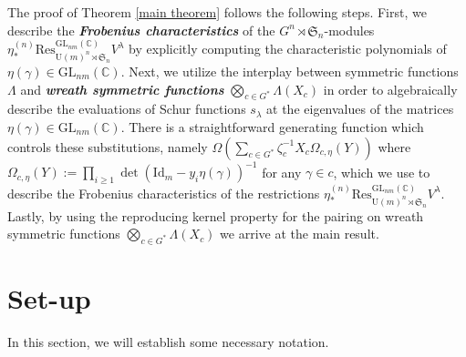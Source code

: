 \documentclass[12pt,reqno]{amsart}
\theoremstyle{definition}
\begin{document}
The proof of Theorem \ref{main theorem} follows the following steps. First, we describe the \textit{\textbf{Frobenius characteristics}} of the $G^{n} \rtimes \mathfrak{S}_n$-modules $\eta^{(n)}_*\mathrm{Res}^{\mathrm{GL}_{nm}(\mathbb{C})}_{\mathrm{U}(m)^{n} \rtimes \mathfrak{S}_n} V^{\lambda}$ by explicitly computing the characteristic polynomials of $\eta(\gamma) \in \mathrm{GL}_{nm}(\mathbb{C}).$ Next, we utilize the interplay between symmetric functions $\Lambda$ and \textit{\textbf{wreath symmetric functions}} $\bigotimes_{c \in G^*} \Lambda(X_{c})$ in order to algebraically describe the evaluations of Schur functions $s_{\lambda}$ at the eigenvalues of the matrices $\eta(\gamma) \in \mathrm{GL}_{nm}(\mathbb{C}).$ There is a straightforward generating function which controls these substitutions, namely $\Omega\left( \sum_{c \in G^*} \zeta_c^{-1} X_{c} \Omega_{c,\eta}(Y) \right)$ where $\Omega_{c,\eta}(Y):= \prod_{i\geq 1} \det( \mathrm{Id}_m - y_i\eta(\gamma))^{-1}$ for any $\gamma \in c$, which we use to describe the Frobenius characteristics of the restrictions $\eta^{(n)}_*\mathrm{Res}^{\mathrm{GL}_{nm}(\mathbb{C})}_{\mathrm{U}(m)^{n} \rtimes \mathfrak{S}_n} V^{\lambda}$. Lastly, by using the reproducing kernel property for the pairing on wreath symmetric functions $\bigotimes_{c \in G^*} \Lambda(X_{c})$ we arrive at the main result.

\section{Set-up}

In this section, we will establish some necessary notation. 
\end{document}
